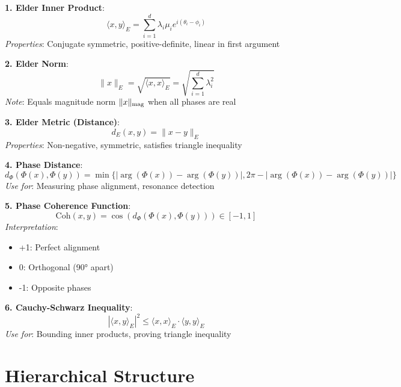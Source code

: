\begin{tcolorbox}[colback=green!5!white,colframe=green!75!black,title=Inner Product Formulas]

\textbf{1. Elder Inner Product}:
$$\langle x, y \rangle_E = \sum_{i=1}^{d} \lambda_i \mu_i e^{i(\theta_i - \phi_i)}$$
\textit{Properties}: Conjugate symmetric, positive-definite, linear in first argument

\textbf{2. Elder Norm}:
$$\|x\|_E = \sqrt{\langle x, x \rangle_E} = \sqrt{\sum_{i=1}^{d} \lambda_i^2}$$
\textit{Note}: Equals magnitude norm $\|x\|_{\text{mag}}$ when all phases are real

\textbf{3. Elder Metric (Distance)}:
$$d_E(x, y) = \|x - y\|_E$$
\textit{Properties}: Non-negative, symmetric, satisfies triangle inequality

\textbf{4. Phase Distance}:
$$d_{\Phi}(\Phi(x), \Phi(y)) = \min\{|\arg(\Phi(x)) - \arg(\Phi(y))|, 2\pi - |\arg(\Phi(x)) - \arg(\Phi(y))|\}$$
\textit{Use for}: Measuring phase alignment, resonance detection

\textbf{5. Phase Coherence Function}:
$$\text{Coh}(x,y) = \cos(d_{\Phi}(\Phi(x), \Phi(y))) \in [-1, 1]$$
\textit{Interpretation}:
\begin{itemize}
\item +1: Perfect alignment
\item 0: Orthogonal (90° apart)
\item -1: Opposite phases
\end{itemize}

\textbf{6. Cauchy-Schwarz Inequality}:
$$|\langle x, y \rangle_E|^2 \leq \langle x, x \rangle_E \cdot \langle y, y \rangle_E$$
\textit{Use for}: Bounding inner products, proving triangle inequality

\end{tcolorbox}

\section{Hierarchical Structure}

